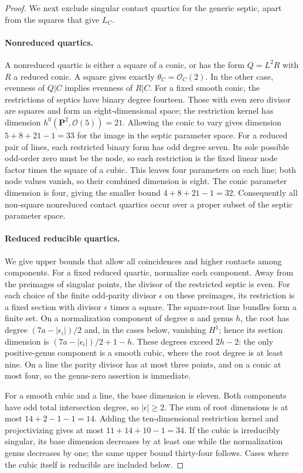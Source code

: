 \begin{proof}
We next exclude singular contact quartics for the generic septic,
apart from the squares that give $L_C$.

\paragraph{Nonreduced quartics.}
A nonreduced quartic is either a square of a conic, or has the form
$Q=L^2R$ with $R$ a reduced conic.  A square gives exactly
$\theta_C=\mathcal O_C(2)$.  In the other case, evenness of $Q|C$
implies evenness of $R|C$.
For a fixed smooth conic, the restrictions of septics have binary
degree fourteen.  Those with even zero divisor are squares and form
an eight-dimensional space; the restriction kernel has dimension
$h^0(\mathbf P^2,\mathcal O(5))=21$.
Allowing the conic to vary gives dimension
$5+8+21-1=33$ for the image in the septic parameter space.
For a reduced pair of lines, each restricted binary form has odd
degree seven.  Its sole possible odd-order zero must be the node,
so each restriction is the fixed linear node factor times the
square of a cubic.  This leaves four parameters on each line;
both node values vanish, so their combined dimension is eight.
The conic parameter dimension is four, giving the smaller bound
$4+8+21-1=32$.  Consequently all non-square nonreduced contact
quartics occur over a proper subset of the septic parameter space.

\paragraph{Reduced reducible quartics.}
We give upper bounds that allow all coincidences and higher contacts
among components.  For a fixed reduced quartic, normalize each
component.  Away from the preimages of singular points, the divisor
of the restricted septic is even.  For each choice of the finite
odd-parity divisor $\epsilon$ on these preimages, its restriction
is a fixed section with divisor $\epsilon$ times a square.
The square-root line bundles form a finite set.  On a normalization
component of degree $a$ and genus $h$, the root has degree
$(7a-|\epsilon_i|)/2$ and, in the cases below, vanishing $H^1$;
hence its section dimension is
$(7a-|\epsilon_i|)/2+1-h$.
These degrees exceed $2h-2$: the only positive-genus component is
a smooth cubic, where the root degree is at least nine.
On a line the parity divisor has at most three points, and on a
conic at most four, so the genus-zero assertion is immediate.

For a smooth cubic and a line, the base dimension is eleven.
Both components have odd total intersection degree, so
$|\epsilon|\ge2$.  The sum of root dimensions is at most
$14+2-1-1=14$.  Adding the ten-dimensional restriction kernel and
projectivizing gives at most $11+14+10-1=34$.
If the cubic is irreducibly singular, its base dimension decreases
by at least one while the normalization genus decreases by one;
the same upper bound thirty-four follows.  Cases where the cubic
itself is reducible are included below.


\end{proof}

